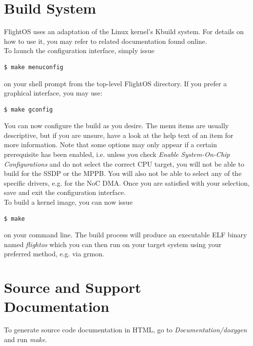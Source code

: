\section {Build System}

FlightOS uses an adaptation of the Linux kernel's Kbuild system. For details on
how to use it, you may refer to related documentation found online. \\

\noindent
To launch the configuration interface, simply issue 

\begin{lstlisting}[language=bash]
  $ make menuconfig
\end{lstlisting}
\noindent
on your shell prompt from the top-level FlightOS directory. If you prefer a
graphical interface, you may use:

\begin{lstlisting}[language=bash]
  $ make gconfig
\end{lstlisting}

\noindent
You can now configure the build as you desire. The menu items are usually
descriptive, but if you are unsure, have a look at the help text of an item for
more information. Note that some options may only appear if a certain
prerequisite has been enabled, i.e. unless you check \emph{Enable
System-On-Chip Configurations} and do not select the correct CPU target, you
will not be able to build for the \gls{SSDP} or the \gls{MPPB}.  You will also
not be able to select any of the specific drivers, e.g. for the \gls{NoC}
\gls{DMA}. Once you are satisfied with your selection, save and exit the
configuration interface.\\

\noindent
To build a kernel image, you can now issue

\begin{lstlisting}[language=bash]
  $ make
\end{lstlisting}

\noindent
on your command line. The build process will produce an executable ELF binary
named \emph{flightos} which you can then run on your target system using your
preferred method, e.g. via grmon.



\section {Source and Support Documentation}

To generate source code documentation in HTML, go to \emph{Documentation/doxygen}
and run \emph{make}.\\

